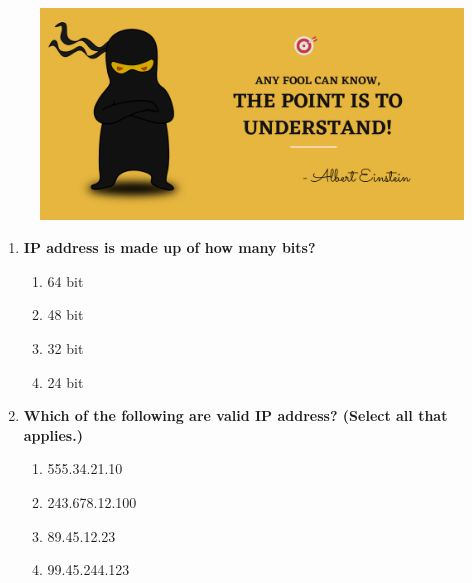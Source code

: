 \setlength{\columnsep}{3pt}
\begin{flushleft}
	
	\paragraph{}
	\bigskip
	
	\begin{figure}[h!]
		\centering
		\includegraphics[scale=.2]{content/practise.jpg}
	\end{figure}	
	\begin{enumerate}
		
		\item \textbf{IP address is made up of how many bits?}
		\begin{enumerate}[label=(\alph*)]
			\item 64 bit
			\item 48 bit
			\item 32 bit  %
			\item 24 bit
		\end{enumerate}
		\bigskip
		\bigskip
		
		\item \textbf{Which of the following are valid IP address? (Select all that applies.)}
		\begin{enumerate}[label=(\alph*)]
			\item 555.34.21.10
			\item 243.678.12.100
			\item 89.45.12.23    %
			\item 99.45.244.123  %
		\end{enumerate}
		\bigskip
		\bigskip	
		

\end{enumerate}
\end{flushleft}
